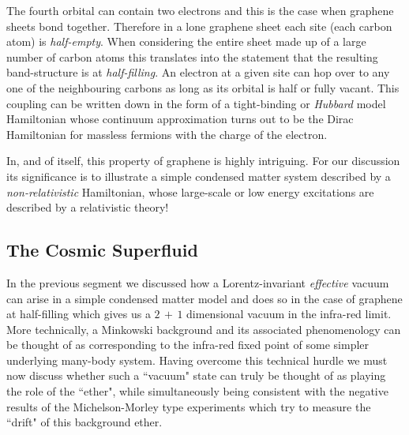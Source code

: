 \begin{doublespace}
The fourth orbital can contain two electrons and this is the case when graphene sheets bond together. Therefore in a lone graphene sheet each site (each carbon atom) is \emph{half-empty}. When considering the entire sheet made up of a large number of carbon atoms this translates into the statement that the resulting band-structure is at \emph{half-filling}. An electron at a given site can hop over to any one of the neighbouring carbons as long as its orbital is half or fully vacant. This coupling can be written down in the form of a tight-binding or \emph{Hubbard} model Hamiltonian \cite{Gonzalez1992The-Electronic, Semenoff1984CondensedMatter} whose continuum approximation turns out to be the Dirac Hamiltonian for massless fermions with the charge of the electron.

In, and of itself, this property of graphene is highly intriguing. For our discussion its significance is to illustrate a simple condensed matter system described by a \emph{non-relativistic} Hamiltonian, whose large-scale or low energy excitations are described by a relativistic theory!	

%
%

\subsection{The Cosmic Superfluid}

In the previous segment we discussed how a Lorentz-invariant \emph{effective} vacuum can arise in a simple condensed matter model and does so in the case of graphene at half-filling which gives us a $ 2\,+\,1 $ dimensional vacuum in the infra-red limit. More technically, a Minkowski background and its associated phenomenology can be thought of as corresponding to the infra-red fixed point of some simpler underlying many-body system. Having overcome this technical hurdle we must now discuss whether such a ``vacuum" state can truly be thought of as playing the role of the ``ether", while simultaneously being consistent with the negative results of the Michelson-Morley type experiments which try to measure the ``drift" of this background ether.


\end{doublespace}
